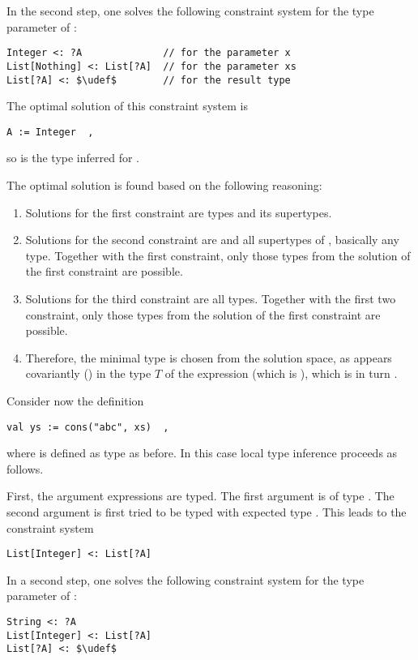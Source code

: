 In the second step, one solves the following constraint system for the type parameter  of :
\begin{lstlisting}
Integer <: ?A              // for the parameter x
List[Nothing] <: List[?A]  // for the parameter xs
List[?A] <: $\udef$        // for the result type
\end{lstlisting}

The optimal solution of this constraint system is 
\begin{lstlisting}
A := Integer  ,
\end{lstlisting}
so  is the type inferred for . 

The optimal solution is found based on the following reasoning: 
\begin{enumerate}
\item Solutions for the first constraint are types  and its supertypes.
\item Solutions for the second constraint are  and all supertypes of , basically any type. Together with the first constraint, only those types from the solution of the first constraint are possible. 
\item Solutions for the third constraint are all types. Together with the first two constraint, only those types from the solution of the first constraint are possible. 
\item Therefore, the minimal type is chosen from the solution space, as  appears covariantly () in the type $T$ of the expression (which is ), which is in turn . 
\end{enumerate}

\example Consider now the definition
\begin{lstlisting}
val ys := cons("abc", xs)  ,
\end{lstlisting}
where  is defined as type  as before. In this case local type inference proceeds as follows.

First, the argument expressions are typed. The first argument  is of type . The second argument  is first tried to be typed with expected type . This leads to the constraint system
\begin{lstlisting}
List[Integer] <: List[?A]
\end{lstlisting}

In a second step, one solves the following constraint system for the type parameter  of :
\begin{lstlisting}
String <: ?A
List[Integer] <: List[?A]
List[?A] <: $\udef$
\end{lstlisting}

